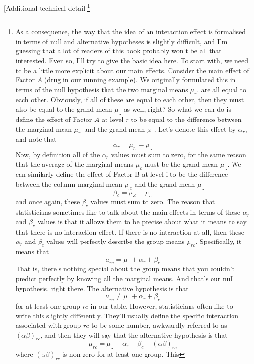 \documentclass[
  a4paper,
]{book}
\begin{document}
{[}Additional technical detail \footnote{As a consequence, the way that
  the idea of an interaction effect is formalised in terms of null and
  alternative hypotheses is slightly difficult, and I'm guessing that a
  lot of readers of this book probably won't be all that interested.
  Even so, I'll try to give the basic idea here. To start with, we need
  to be a little more explicit about our main effects. Consider the main
  effect of Factor \(A\) (drug in our running example). We originally
  formulated this in terms of the null hypothesis that the two marginal
  means \(\mu_r\). are all equal to each other. Obviously, if all of
  these are equal to each other, then they must also be equal to the
  grand mean \(\mu_{..}\) as well, right? So what we can do is define
  the effect of Factor \(A\) at level \(r\) to be equal to the
  difference between the marginal mean \(\mu_{r.}\) and the grand mean
  \(\mu_{..}\). Let's denote this effect by \(\alpha_r\), and note that
  \[\alpha_r=\mu_{r.}-\mu_{..}\] Now, by definition all of the
  \(\alpha_r\) values must sum to zero, for the same reason that the
  average of the marginal means \(\mu_c\) must be the grand mean
  \(\mu_{..}\). We can similarly define the effect of Factor B at level
  i to be the difference between the column marginal mean \(\mu_{.c}\)
  and the grand mean \(\mu_{..}\) \[\beta_c=\mu_{.c}-\mu_{..}\] and once
  again, these \(\beta_c\) values must sum to zero. The reason that
  statisticians sometimes like to talk about the main effects in terms
  of these \(\alpha_r\) and \(\beta_c\) values is that it allows them to
  be precise about what it means to say that there is no interaction
  effect. If there is no interaction at all, then these \(\alpha_r\) and
  \(\beta_c\) values will perfectly describe the group means
  \(\mu_{rc}\). Specifically, it means that
  \[\mu_{rc}=\mu_{..}+\alpha_{r}+\beta_{c}\] That is, there's nothing
  special about the group means that you couldn't predict perfectly by
  knowing all the marginal means. And that's our null hypothesis, right
  there. The alternative hypothesis is that
  \[\mu_{rc} \neq \mu_{..}+\alpha_{r}+\beta_{c}\] for at least one group
  \(rc\) in our table. However, statisticians often like to write this
  slightly differently. They'll usually define the specific interaction
  associated with group \(rc\) to be some number, awkwardly referred to
  as \((\alpha \beta)_{rc}\), and then they will say that the
  alternative hypothesis is that
  \[\mu_{rc}=\mu_{..} +\alpha_{r} +\beta_{c} + (\alpha \beta )_{rc}\]
  where \((\alpha \beta)_{rc}\) is non-zero for at least one group. This
}
\end{document}
